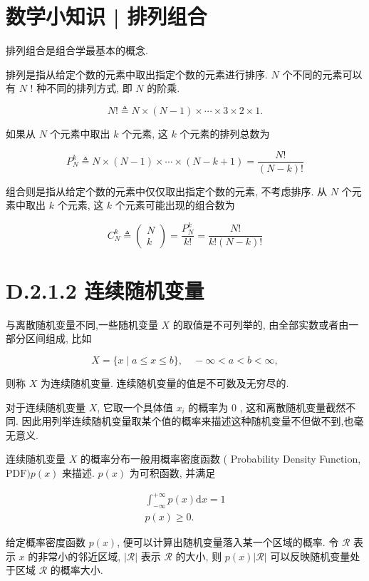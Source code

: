 \documentclass[10pt]{article}
\begin{document}
\section*{数学小知识 | 排列组合}
排列组合是组合学最基本的概念.

排列是指从给定个数的元素中取出指定个数的元素进行排序. $N$ 个不同的元素可以有 $N$ ! 种不同的排列方式, 即 $N$ 的阶乘.

$$
N ! \triangleq N \times(N-1) \times \cdots \times 3 \times 2 \times 1 .
$$

如果从 $N$ 个元素中取出 $k$ 个元素, 这 $k$ 个元素的排列总数为

$$
P_{N}^{k} \triangleq N \times(N-1) \times \cdots \times(N-k+1)=\frac{N !}{(N-k) !}
$$

组合则是指从给定个数的元素中仅仅取出指定个数的元素, 不考虑排序. 从 $N$ 个元素中取出 $k$ 个元素, 这 $k$ 个元素可能出现的组合数为

$$
C_{N}^{k} \triangleq\left(\begin{array}{c}
N \\
k
\end{array}\right)=\frac{P_{N}^{k}}{k !}=\frac{N !}{k !(N-k) !}
$$

\section*{D.2.1.2 连续随机变量}
与离散随机变量不同,一些随机变量 $X$ 的取值是不可列举的, 由全部实数或者由一部分区间组成, 比如

$$
X=\{x \mid a \leq x \leq b\}, \quad-\infty<a<b<\infty,
$$

则称 $X$ 为连续随机变量. 连续随机变量的值是不可数及无穷尽的.

对于连续随机变量 $X$, 它取一个具体值 $x_{i}$ 的概率为 0 , 这和离散随机变量截然不同. 因此用列举连续随机变量取某个值的概率来描述这种随机变量不但做不到,也毫无意义.

连续随机变量 $X$ 的概率分布一般用概率密度函数 ( Probability Density Function, $\mathrm{PDF}) p(x)$ 来描述. $p(x)$ 为可积函数, 并满足

\[
\begin{array}{r}
\int_{-\infty}^{+\infty} p(x) \mathrm{d} x=1 \\
p(x) \geq 0 . \tag{D.10}
\end{array}
\]

给定概率密度函数 $p(x)$, 便可以计算出随机变量落入某一个区域的概率. 令 $\mathcal{R}$ 表示 $x$ 的非常小的邻近区域, $|\mathcal{R}|$ 表示 $\mathcal{R}$ 的大小, 则 $p(x)|\mathcal{R}|$ 可以反映随机变量处于区域 $\mathcal{R}$ 的概率大小.
\end{document}

